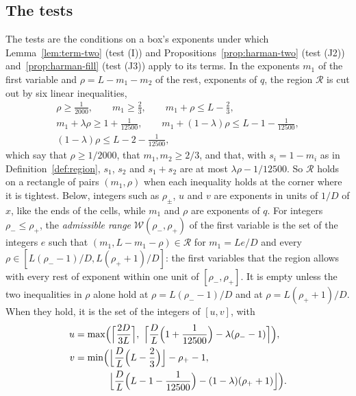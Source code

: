 \documentclass[11pt]{article}
\theoremstyle{definition}
\begin{document}
\subsection{The tests}\label{sec:tests}

The tests are the conditions on a box's exponents under which Lemma~\ref{lem:term-two} (test (I)) and
Propositions~\ref{prop:harman-two} (test (J2)) and~\ref{prop:harman-fill} (test (J3)) apply to its terms. In the
exponents $m_1$ of the first
variable and $\rho = L - m_1 - m_2$ of the rest, exponents of $q$, the region $\mathcal R$ is cut out by six linear
inequalities,
\begin{gather*}
  \rho \ge \tfrac1{2000}, \qquad m_1 \ge \tfrac23, \qquad m_1 + \rho \le L - \tfrac23, \\
  m_1 + \lambda \rho \ge 1 + \tfrac1{12500}, \qquad m_1 + (1 - \lambda)\rho \le L - 1 - \tfrac1{12500}, \\
  (1 - \lambda)\rho \le L - 2 - \tfrac1{12500},
\end{gather*}
which say that $\rho \ge 1/2000$, that $m_1, m_2 \ge 2/3$, and that, with $s_i = 1 - m_i$ as in
Definition~\ref{def:region}, $s_1$, $s_2$ and $s_1 + s_2$ are at most
$\lambda\rho
- 1/12500$. So $\mathcal R$ holds on a rectangle of pairs $(m_1, \rho)$ when each inequality holds at the corner where
it
is tightest. Below, integers such as $\rho_\pm$, $u$ and $v$ are exponents in units of $1/D$ of $x$, like the ends of
the cells, while $m_1$ and $\rho$ are exponents of $q$. For integers $\rho_- \le \rho_+$, the \emph{admissible range}
$\mathcal W(\rho_-, \rho_+)$ of the first variable is the set of the integers
$e$ such that $(m_1, L - m_1 - \rho) \in \mathcal R$ for $m_1 = Le/D$ and every $\rho \in [L(\rho_- - 1)/D, L(\rho_+ +
1)/D]$: the first variables that the region allows with every rest of exponent within one unit of $[\rho_-, \rho_+]$. It
is empty unless the two inequalities in $\rho$ alone hold at $\rho = L(\rho_- - 1)/D$ and at $\rho = L(\rho_+ + 1)/D$.
When they hold, it is the set of the integers of $[u, v]$, with
\begin{align*}
  u &= \max\Bigl(\Bigl\lceil \frac{2D}{3L} \Bigr\rceil,\ \Bigl\lceil \frac DL \Bigl(1 + \frac1{12500}\Bigr) -
  \lambda(\rho_- - 1) \Bigr\rceil\Bigr), \\
  v &= \min\Bigl(\Bigl\lfloor \frac DL \Bigl(L - \frac23\Bigr) \Bigr\rfloor - \rho_+ - 1,\\
  &\hphantom{{}= \min\Bigl(} \Bigl\lfloor \frac DL \Bigl(L - 1 - \frac1{12500}\Bigr) - (1 - \lambda)(\rho_+ + 1)
  \Bigr\rfloor\Bigr).
\end{align*}
\end{document}
